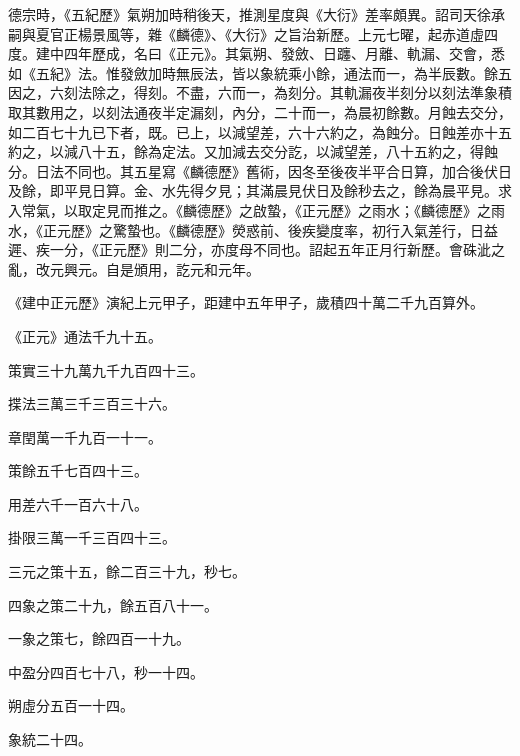 \begin{pinyinscope}
 德宗時，《五紀歷》氣朔加時稍後天，推測星度與《大衍》差率頗異。詔司天徐承嗣與夏官正楊景風等，雜《麟德》、《大衍》之旨治新歷。上元七曜，起赤道虛四度。建中四年歷成，名曰《正元》。其氣朔、發斂、日躔、月離、軌漏、交會，悉如《五紀》法。惟發斂加時無辰法，皆以象統乘小餘，通法而一，為半辰數。餘五因之，六刻法除之，得刻。不盡，六而一，為刻分。其軌漏夜半刻分以刻法準象積取其數用之，以刻法通夜半定漏刻，內分，二十而一，為晨初餘數。月蝕去交分，如二百七十九已下者，既。已上，以減望差，六十六約之，為蝕分。日蝕差亦十五約之，以減八十五，餘為定法。又加減去交分訖，以減望差，八十五約之，得蝕分。日法不同也。其五星寫《麟德歷》舊術，因冬至後夜半平合日算，加合後伏日及餘，即平見日算。金、水先得夕見；其滿晨見伏日及餘秒去之，餘為晨平見。求入常氣，以取定見而推之。《麟德歷》之啟蟄，《正元歷》之雨水；《麟德歷》之雨水，《正元歷》之驚蟄也。《麟德歷》熒惑前、後疾變度率，初行入氣差行，日益遲、疾一分，《正元歷》則二分，亦度母不同也。詔起五年正月行新歷。會硃泚之亂，改元興元。自是頒用，訖元和元年。



 《建中正元歷》演紀上元甲子，距建中五年甲子，歲積四十萬二千九百算外。



 《正元》通法千九十五。



 策實三十九萬九千九百四十三。



 揲法三萬三千三百三十六。



 章閏萬一千九百一十一。



 策餘五千七百四十三。



 用差六千一百六十八。



 掛限三萬一千三百四十三。



 三元之策十五，餘二百三十九，秒七。



 四象之策二十九，餘五百八十一。



 一象之策七，餘四百一十九。



 中盈分四百七十八，秒一十四。



 朔虛分五百一十四。



 象統二十四。




\end{pinyinscope}
